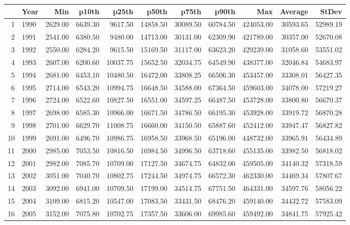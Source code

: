\documentclass[12pt, letterpaper, leqno]{article}
\begin{document}
\begin{appendices}
\begin{table}[ht]
	\centering
	\begin{tabular}{rlrrrrrrrrr}
	  \hline
	 & Year & Min & p10th & p25th & p50th & p75th & p90th & Max & Average & StDev \\ 
	  \hline
	1 & 1990 & 2629.00 & 6639.30 & 9617.50 & 14858.50 & 30089.50 & 60784.50 & 424053.00 & 30593.65 & 52989.19 \\ 
	  2 & 1991 & 2541.00 & 6380.50 & 9480.00 & 14713.00 & 30131.00 & 62309.90 & 421789.00 & 30357.00 & 52670.08 \\ 
	  3 & 1992 & 2550.00 & 6284.20 & 9615.50 & 15169.50 & 31117.00 & 63623.20 & 429239.00 & 31058.60 & 53551.02 \\ 
	  4 & 1993 & 2607.00 & 6200.60 & 10037.75 & 15652.50 & 32034.75 & 64549.90 & 438377.00 & 32046.84 & 54683.97 \\ 
	  5 & 1994 & 2681.00 & 6453.10 & 10480.50 & 16472.00 & 33808.25 & 66506.30 & 453457.00 & 33308.01 & 56427.35 \\ 
	  6 & 1995 & 2714.00 & 6543.20 & 10994.75 & 16648.50 & 34588.00 & 67364.50 & 459603.00 & 34078.00 & 57219.27 \\ 
	  7 & 1996 & 2724.00 & 6522.60 & 10827.50 & 16551.00 & 34597.25 & 66487.50 & 453728.00 & 33800.80 & 56670.37 \\ 
	  8 & 1997 & 2698.00 & 6585.30 & 10966.00 & 16671.50 & 34786.50 & 66195.30 & 453928.00 & 33919.72 & 56870.28 \\ 
	  9 & 1998 & 2701.00 & 6629.70 & 11008.75 & 16660.00 & 34150.50 & 65887.60 & 452412.00 & 33947.47 & 56827.82 \\ 
	  10 & 1999 & 2691.00 & 6496.70 & 10986.75 & 16958.50 & 33968.50 & 65196.00 & 448732.00 & 33965.91 & 56434.89 \\ 
	  11 & 2000 & 2985.00 & 7053.50 & 10816.50 & 16984.50 & 34996.50 & 63718.60 & 455135.00 & 33982.50 & 56818.02 \\ 
	  12 & 2001 & 2982.00 & 7085.70 & 10709.00 & 17127.50 & 34674.75 & 64832.00 & 459505.00 & 34140.32 & 57318.59 \\ 
	  13 & 2002 & 3051.00 & 7040.70 & 10802.75 & 17244.50 & 34974.75 & 66572.30 & 462330.00 & 34469.34 & 57807.67 \\ 
	  14 & 2003 & 3092.00 & 6941.00 & 10709.50 & 17199.00 & 34514.75 & 67751.50 & 464331.00 & 34597.76 & 58056.22 \\ 
	  15 & 2004 & 3109.00 & 6815.20 & 10547.00 & 17083.50 & 33431.50 & 68476.20 & 459140.00 & 34432.72 & 57583.09 \\ 
	  16 & 2005 & 3152.00 & 7075.80 & 10702.75 & 17357.50 & 33606.00 & 69985.60 & 459492.00 & 34841.75 & 57925.42 \\ 

\end{tabular}
\end{table}
\end{appendices}
\end{document}
